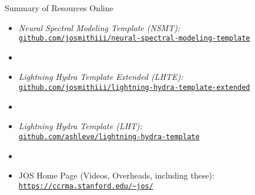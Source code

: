 \begin{slide}[\slideopts,toc={}]{Summary of Resources Online}
  \begin{itemize}
    \item \emph{Neural Spectral Modeling Template (NSMT):}\\
      \href{https://github.com/josmithiii/neural-spectral-modeling-template.git}
           {\texttt{github.com/josmithiii/neural-spectral-modeling-template}}
    \item[]
    \item \emph{Lightning Hydra Template Extended (LHTE):}\\
      \href{https://github.com/josmithiii/lightning-hydra-template-extended.git}
           {\texttt{github.com/josmithiii/lightning-hydra-template-extended}}
    \item[]
    \item \emph{Lightning Hydra Template (LHT):}\\
      \href{https://github.com/ashleve/lightning-hydra-template}
           {\texttt{github.com/ashleve/lightning-hydra-template}}
    \item[]
    \item JOS Home Page (Videos, Overheads, including these):\\
      \href{https://ccrma.stanford.edu/~jos/Welcome.html}
           {\texttt{https://ccrma.stanford.edu/\~{}jos/}}
  \end{itemize}
\end{slide}
